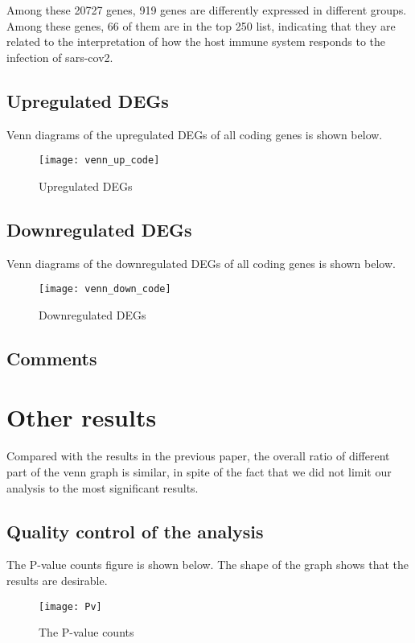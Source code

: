 \documentclass[en,black,12pt,normal]{elegantnote}
\begin{document}
Among these 20727 genes, 919 genes are differently expressed in different groups.
Among these genes, 66 of them are in the top 250 list, indicating that
they are related to the interpretation of how the host immune system responds to the infection of sars-cov2.

\subsection{Upregulated DEGs}
Venn diagrams of the upregulated DEGs of all coding genes is shown below.

\begin{figure}[H]
    \centering
    \texttt{[image: venn\_up\_code]}
    \caption{Upregulated DEGs}
    \label{VU}
\end{figure}


\subsection{Downregulated DEGs}
Venn diagrams of the downregulated DEGs of all coding genes is shown below.

\begin{figure}[H]
    \centering
    \texttt{[image: venn\_down\_code]}
    \caption{Downregulated DEGs}
    \label{VD}
\end{figure}

\subsection{Comments}

\section{Other results}
Compared with the results in the previous paper,
the overall ratio of different part of the venn graph
is similar, in spite of the fact that we did not limit our
analysis to the most significant results.


\subsection{Quality control of the analysis}

The P-value counts figure is shown below.
The shape of the graph shows that the results are desirable.

\begin{figure}[H]
    \centering
    \texttt{[image: Pv]}
    \caption{The P-value counts}
    \label{PV}
\end{figure}
\end{document}
